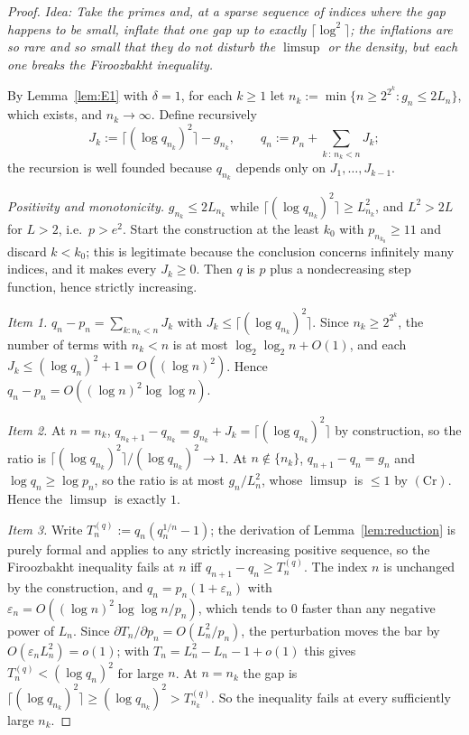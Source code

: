 \documentclass[11pt,a4paper]{article}
\theoremstyle{plain}
\theoremstyle{definition}
\theoremstyle{remark}
\newcommand{\idea}[1]{\emph{Idea: #1}\par\smallskip}
\begin{document}
\begin{proof}
\idea{Take the primes and, at a sparse sequence of indices where the gap happens to be
small, inflate that one gap up to exactly $\lceil \log^2 \rceil$; the inflations are so rare
and so small that they do not disturb the $\limsup$ or the density, but each one breaks the
Firoozbakht inequality.}
By Lemma~\ref{lem:E1} with $\delta = 1$, for each $k \ge 1$ let
$n_k := \min\{n \ge 2^{2^k} : g_n \le 2L_n\}$, which exists, and $n_k \to \infty$. Define
recursively
\[
J_k := \bigl\lceil (\log q_{n_k})^2 \bigr\rceil - g_{n_k},
\qquad
q_n := p_n + \sum_{k\,:\,n_k < n} J_k ;
\]
the recursion is well founded because $q_{n_k}$ depends only on $J_1,\dots,J_{k-1}$.

\emph{Positivity and monotonicity.} $g_{n_k} \le 2L_{n_k}$ while
$\lceil (\log q_{n_k})^2\rceil \ge L_{n_k}^2$, and $L^2 > 2L$ for $L > 2$, i.e.\ $p > e^2$.
Start the construction at the least $k_0$ with $p_{n_{k_0}} \ge 11$ and discard $k < k_0$;
this is legitimate because the conclusion concerns infinitely many indices, and it makes
every $J_k \ge 0$. Then $q$ is $p$ plus a nondecreasing step function, hence strictly
increasing.

\emph{Item 1.} $q_n - p_n = \sum_{k : n_k < n} J_k$ with
$J_k \le \lceil (\log q_{n_k})^2\rceil$. Since $n_k \ge 2^{2^k}$, the number of terms with
$n_k < n$ is at most $\log_2\log_2 n + O(1)$, and each $J_k \le (\log q_n)^2 + 1 = O((\log n)^2)$.
Hence $q_n - p_n = O((\log n)^2\log\log n)$.

\emph{Item 2.} At $n = n_k$, $q_{n_k+1} - q_{n_k} = g_{n_k} + J_k = \lceil(\log q_{n_k})^2\rceil$
by construction, so the ratio is $\lceil(\log q_{n_k})^2\rceil/(\log q_{n_k})^2 \to 1$. At
$n \notin \{n_k\}$, $q_{n+1}-q_n = g_n$ and $\log q_n \ge \log p_n$, so the ratio is at most
$g_n/L_n^2$, whose $\limsup$ is $\le 1$ by $(\mathrm{Cr})$. Hence the $\limsup$ is exactly $1$.

\emph{Item 3.} Write $T^{(q)}_n := q_n(q_n^{1/n}-1)$; the derivation of
Lemma~\ref{lem:reduction} is purely formal and applies to any strictly increasing positive
sequence, so the Firoozbakht inequality fails at $n$ iff $q_{n+1}-q_n \ge T^{(q)}_n$. The
index $n$ is unchanged by the construction, and $q_n = p_n(1+\varepsilon_n)$ with
$\varepsilon_n = O((\log n)^2\log\log n/p_n)$, which tends to $0$ faster than any negative
power of $L_n$. Since $\partial T_n/\partial p_n = O(L_n^2/p_n)$, the perturbation moves the
bar by $O(\varepsilon_n L_n^2) = o(1)$; with $T_n = L_n^2 - L_n - 1 + o(1)$
\cite[\S5, Thm.~5]{kourbatov2015bounds} this gives $T^{(q)}_n < (\log q_n)^2$ for large $n$.
At $n = n_k$ the gap is $\lceil(\log q_{n_k})^2\rceil \ge (\log q_{n_k})^2 > T^{(q)}_{n_k}$.
So the inequality fails at every sufficiently large $n_k$.
\end{proof}
\end{document}
